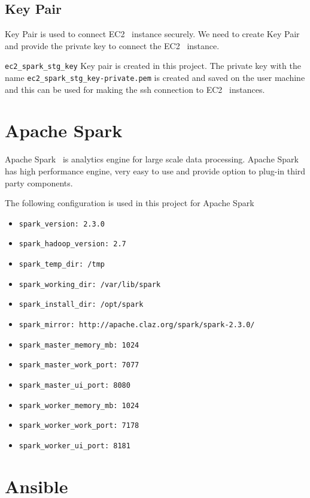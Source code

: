 \subsection{Key Pair}

Key Pair is used to connect EC2~\cite{hid-sp18-511-www-ec2}
instance securely. We need to create Key Pair and provide the private key to
connect the EC2~\cite{hid-sp18-511-www-ec2} instance.

\verb|ec2_spark_stg_key| Key pair is created in this project.
The private key with the name \verb|ec2_spark_stg_key-private.pem| is
created and saved on the user machine and this can be used for making the ssh
connection to EC2~\cite{hid-sp18-511-www-ec2} instances.

\section{Apache Spark}

Apache Spark~\cite{hid-sp18-511-www-spark} is analytics engine for
large scale data processing. Apache
Spark~\cite{hid-sp18-511-www-spark} has high performance engine, very
easy to use and provide option to plug-in third party components.

The following configuration is used in this project for Apache Spark

\begin{itemize}
	\item \verb|spark_version: 2.3.0|
	\item \verb|spark_hadoop_version: 2.7|
	\item \verb|spark_temp_dir: /tmp|
	\item \verb|spark_working_dir: /var/lib/spark|
	\item \verb|spark_install_dir: /opt/spark|
	\item \verb|spark_mirror: http://apache.claz.org/spark/spark-2.3.0/|
	\item \verb|spark_master_memory_mb: 1024|
	\item \verb|spark_master_work_port: 7077|
	\item \verb|spark_master_ui_port: 8080|
	\item \verb|spark_worker_memory_mb: 1024|
	\item \verb|spark_worker_work_port: 7178|
	\item \verb|spark_worker_ui_port: 8181|
\end{itemize}

\section{Ansible}

